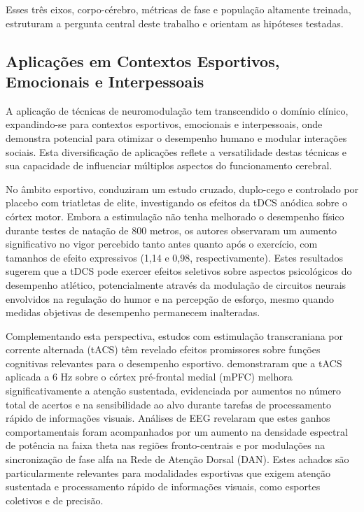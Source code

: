 Esses três eixos, corpo-cérebro, métricas de fase e população altamente treinada, estruturam a pergunta central deste trabalho e orientam as hipóteses testadas.

\subsection{Aplicações em Contextos Esportivos, Emocionais e Interpessoais}
A aplicação de técnicas de neuromodulação tem transcendido o domínio clínico, expandindo-se para contextos esportivos, emocionais e interpessoais, onde demonstra potencial para otimizar o desempenho humano e modular interações sociais. Esta diversificação de aplicações reflete a versatilidade destas técnicas e sua capacidade de influenciar múltiplos aspectos do funcionamento cerebral.

No âmbito esportivo,  conduziram um estudo cruzado, duplo-cego e controlado por placebo com triatletas de elite, investigando os efeitos da tDCS anódica sobre o córtex motor. Embora a estimulação não tenha melhorado o desempenho físico durante testes de natação de 800 metros, os autores observaram um aumento significativo no vigor percebido tanto antes quanto após o exercício, com tamanhos de efeito expressivos (1,14 e 0,98, respectivamente). Estes resultados sugerem que a tDCS pode exercer efeitos seletivos sobre aspectos psicológicos do desempenho atlético, potencialmente através da modulação de circuitos neurais envolvidos na regulação do humor e na percepção de esforço, mesmo quando medidas objetivas de desempenho permanecem inalteradas.

Complementando esta perspectiva, estudos com estimulação transcraniana por corrente alternada (tACS) têm revelado efeitos promissores sobre funções cognitivas relevantes para o desempenho esportivo.  demonstraram que a tACS aplicada a 6 Hz sobre o córtex pré-frontal medial (mPFC) melhora significativamente a atenção sustentada, evidenciada por aumentos no número total de acertos e na sensibilidade ao alvo durante tarefas de processamento rápido de informações visuais. Análises de EEG revelaram que estes ganhos comportamentais foram acompanhados por um aumento na densidade espectral de potência na faixa theta nas regiões fronto-centrais e por modulações na sincronização de fase alfa na Rede de Atenção Dorsal (DAN). Estes achados são particularmente relevantes para modalidades esportivas que exigem atenção sustentada e processamento rápido de informações visuais, como esportes coletivos e de precisão.

